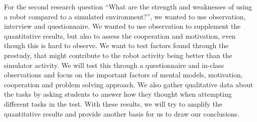 \bigskip\noindent
For the second research question ``What are the strength and weaknesses of using a robot compared to a simulated environment?'',  we wanted to use observation, interview and questionnaire. We wanted to use observation to supplement the quantitative results, but also to assess the cooperation and motivation, even though this is hard to observe. We want to test factors found through the prestudy, that might contribute to the robot activity being better than the simulator activity. We will test this through a questionnaire and in-class observations and focus on the important factors of mental models, motivation, cooperation and problem solving approach. We also gather qualitative data about the tasks by asking students to answer how they thought when attempting different tasks in the test. With these results, we will try to amplify the quantitative results and provide another basis for us to draw our conclusions. 


